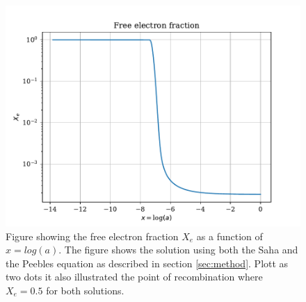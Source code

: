 \documentclass[onecolumn]{aastex62}
\begin{document}
\begin{figure}
    \includegraphics[scale=0.8]{figures/xe.pdf}
    \caption{Figure showing the free electron fraction $X_e$ as a function of $x=log(a)$. The figure shows the solution using both the Saha and the Peebles equation as described in section \ref{sec:method}. Plott as two dots it also illustrated the point of recombination where $X_e=0.5$ for both solutions.}
    \label{fig:xe}
\end{figure}
\end{document}
